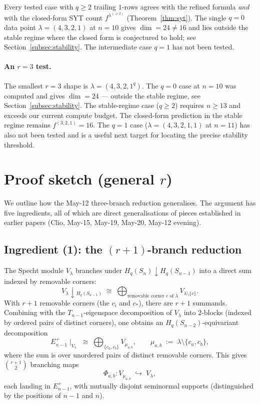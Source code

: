 \documentclass[11pt]{article}
\theoremstyle{definition}
\begin{document}
Every tested case with $q \ge 2$ trailing $1$-rows agrees with the
refined formula \emph{and} with the closed-form SYT count
$f^{\lambda^{(\ge 2)}}$ (Theorem~\ref{thm:syt}). The single $q = 0$
data point $\lambda = (4, 3, 2, 1)$ at $n = 10$ gives $\dim = 24 \ne 16$
and lies outside the stable regime where the closed form is conjectured
to hold; see Section~\ref{subsec:stability}. The intermediate case
$q = 1$ has not been tested.

\paragraph{An $r = 3$ test.}
The smallest $r = 3$ shape is $\lambda = (4, 3, 2, 1^q)$. The $q = 0$
case at $n = 10$ was computed and gives $\dim = 24$ --- outside the
stable regime, see Section~\ref{subsec:stability}. The stable-regime
case ($q \ge 2$) requires $n \ge 13$ and exceeds our current compute
budget. The closed-form prediction in the stable regime remains
$f^{(3, 2, 1)} = 16$. The $q = 1$ case ($\lambda = (4, 3, 2, 1, 1)$ at
$n = 11$) has also not been tested and is a useful next target for
locating the precise stability threshold.

\section{Proof sketch (general $r$)}\label{sec:proof}

We outline how the May-12 three-branch reduction generalises. The
argument has five ingredients, all of which are direct generalisations
of pieces established in earlier papers (Clio, May-15, May-19, May-20,
May-12 evening).

\subsection{Ingredient (1): the $(r+1)$-branch reduction}

The Specht module $V_\lambda$ branches under $H_q(S_n) \downarrow H_q(S_{n-1})$
into a direct sum indexed by removable corners:
\[
   V_\lambda \!\downarrow\!_{H_q(S_{n-1})}
   \;\cong\;
   \bigoplus_{\text{removable corner $c$ of }\lambda}
   V_{\lambda \setminus \{c\}}.
\]
With $r + 1$ removable corners (the $c_i$ and $c_*$), there are
$r + 1$ summands. Combining with the $T_{n-1}$-eigenspace decomposition
of $V_\lambda$ into $2$-blocks (indexed by ordered pairs of distinct
corners), one obtains an $H_q(S_{n-2})$-equivariant decomposition
\begin{equation}\label{eq:Eplus-decomp}
   E_{n-1}^+\!\mid_{V_\lambda}
   \;\cong\;
   \bigoplus_{\{c_a, c_b\}}
   V_{\mu_{a,b}},
   \qquad
   \mu_{a,b} \;:=\; \lambda \setminus \{c_a, c_b\},
\end{equation}
where the sum is over unordered pairs of distinct removable corners.
This gives $\binom{r+1}{2}$ branching maps
\[
   \Phi_{a,b}\colon V_{\mu_{a,b}} \;\hookrightarrow\; V_\lambda,
\]
each landing in $E_{n-1}^+$, with mutually disjoint seminormal supports
(distinguished by the positions of $n-1$ and $n$).
\end{document}
